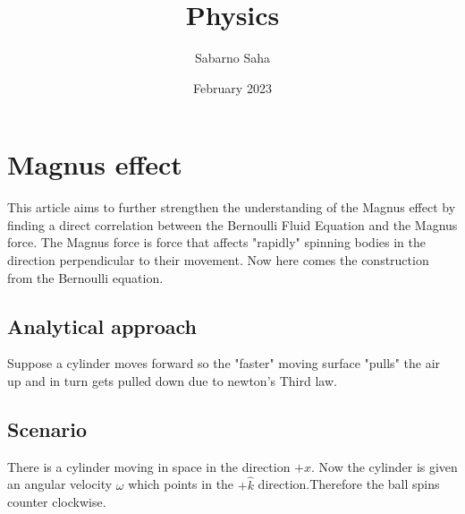 \documentclass{article}
\title{Physics}
\author{Sabarno Saha}
\date{February 2023}
\begin{document}
\maketitle
\newpage
\tableofcontents
\newpage
\section{Magnus effect }
This article aims to further strengthen the understanding of the Magnus effect by finding a direct correlation between the Bernoulli Fluid Equation and the Magnus force. The Magnus force is force that affects "rapidly" spinning bodies in the direction perpendicular to their movement. Now here comes the construction from the Bernoulli equation.
\subsection{Analytical approach}
Suppose a cylinder moves forward so the "faster" moving surface "pulls" the air up and in turn gets pulled down due to newton's Third law.
\subsection{Scenario}
There is a cylinder moving in space in the direction $+\hat{x}$. Now the cylinder is given an angular velocity $\omega$ which points in the $+\hat{k}$ direction.Therefore the ball spins counter clockwise.
\end{document}
